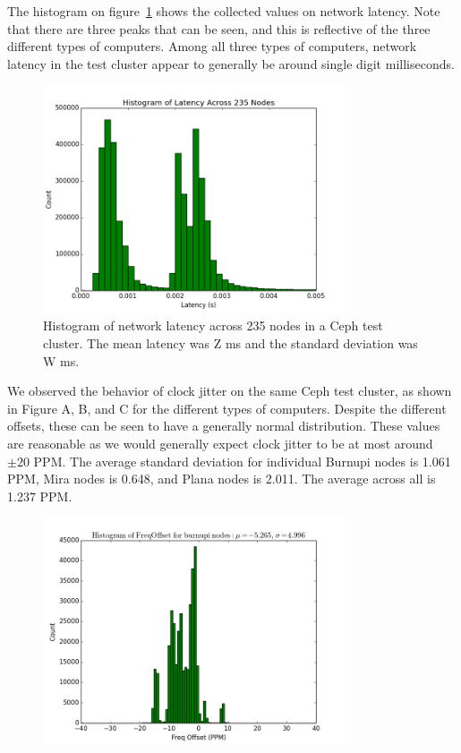 The histogram on figure~\ref{fig:latency-hist} shows the collected
values on network latency. Note that there are three peaks that can be
seen, and this is reflective of the three different types of
computers. Among all three types of computers, network latency in the
test cluster appear to generally be around single digit milliseconds.

\begin{figure}[h]
  \centering
  \caption{Histogram of network latency across 235 nodes in a Ceph test cluster. The mean latency was Z ms and the standard deviation was W ms.} %
  \label{fig:latency-hist}
  \includegraphics[width=0.8\textwidth]{latency-hist.png}
\end{figure}


We observed the behavior of clock jitter on the same Ceph test
cluster, as shown in Figure A, B, and C for the different types of
computers. Despite the different offsets, these can be seen to have a
generally normal distribution. These values are reasonable as we would
generally expect clock jitter to be at most around $\pm 20$ PPM. The average
standard deviation for individual Burnupi nodes is 1.061 PPM, Mira
nodes is 0.648, and Plana nodes is 2.011. The average across all is
1.237 PPM.


\begin{figure}[h]
  \centering
  \includegraphics[width=0.8\textwidth]{burnupi-freq-offset.png}
\end{figure}

